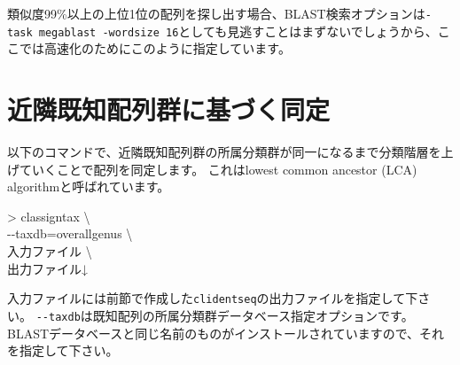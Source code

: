 \documentclass[titlepage,10pt,a4paper]{jsbook}
\newenvironment{cmd}{\begin{oframed}\raggedright\ttfamily\footnotesize\setlength{\baselineskip}{1.4em}}{\end{oframed}\vspace{-1em}}
\begin{document}
類似度99\%以上の上位1位の配列を探し出す場合、BLAST検索オプションは\texttt{-task megablast -word{\textunderscore}size 16}としても見逃すことはまずないでしょうから、ここでは高速化のためにこのように指定しています。

\section{近隣既知配列群に基づく同定}

以下のコマンドで、近隣既知配列群の所属分類群が同一になるまで分類階層を上げていくことで配列を同定します。
これはlowest common ancestor (LCA) algorithmと呼ばれています\citep{Huson2007}。
\begin{cmd}
{\textgreater} classigntax {\textbackslash}\\
{-}{-}taxdb=overall{\textunderscore}genus {\textbackslash}\\
入力ファイル {\textbackslash}\\
出力ファイル↓
\end{cmd}
入力ファイルには前節で作成した\texttt{clidentseq}の出力ファイルを指定して下さい。
\texttt{{-}{-}taxdb}は既知配列の所属分類群データベース指定オプションです。
BLASTデータベースと同じ名前のものがインストールされていますので、それを指定して下さい。
\end{document}
